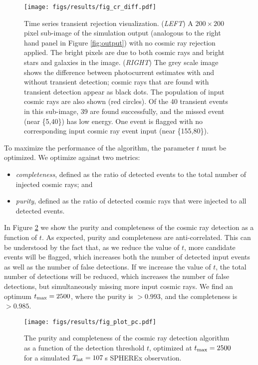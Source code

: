 \documentclass{ws-jai}
\begin{document}
\begin{figure*}[ht!]
\centering
\texttt{[image: figs/results/fig\_cr\_diff.pdf]}
\caption{Time series transient rejection visualization.
  (\textit{LEFT}) A $200 \times 200$ pixel sub-image of the simulation
  output (analogous to the right hand panel in Figure
  \ref{fig:output}) with no cosmic ray rejection applied.  The bright
  pixels are due to both cosmic rays and bright stars and galaxies in
  the image.  (\textit{RIGHT}) The grey scale image shows the
  difference between photocurrent estimates with and without transient
  detection; cosmic rays that are found with transient detection
  appear as black dots.  The population of input cosmic rays are also
  shown (red circles).  Of the 40 transient events in this sub-image,
  39 are found successfully, and the missed event (near \{5,40\}) has
  low energy.  One event is flagged with no corresponding input cosmic
  ray event input (near \{155,80\}).  \label{fig:tfsf} }
\end{figure*}

To maximize the performance of the algorithm, the parameter $t$ must
be optimized.  We optimize against two metrics:
%
\begin{itemize}

  \item \emph{completeness}, defined as the ratio of detected events
    to the total number of injected cosmic rays; and

  \item \emph{purity}, defined as the ratio of detected cosmic rays that
    were injected to all detected events.

\end{itemize}
%
In Figure \ref{fig:pc} we show the purity and completeness of the
cosmic ray detection as a function of $t$.  As expected, purity and
completeness are anti-correlated.  This can be understood by the fact
that, as we reduce the value of $t$, more candidate events will be
flagged, which increases both the number of detected input events as
well as the number of false detections.  If we increase the value of
$t$, the total number of detections will be reduced, which increases
the number of false detections, but simultaneously missing more input
cosmic rays.  We find an optimum $t_{\rm max} = 2500$, where the
purity is $>0.993$, and the completeness is $>0.985$.

\begin{figure*}[ht!]
\centering
\texttt{[image: figs/results/fig\_plot\_pc.pdf]}
\caption{The purity and completeness of the cosmic ray detection
  algorithm as a function of the detection threshold $t$, optimized
  at $t_{\rm max}=2500$ for a simulated $T_{\rm int} = 107 \,$s
  SPHEREx observation.  \label{fig:pc} }
\end{figure*}
\end{document}
